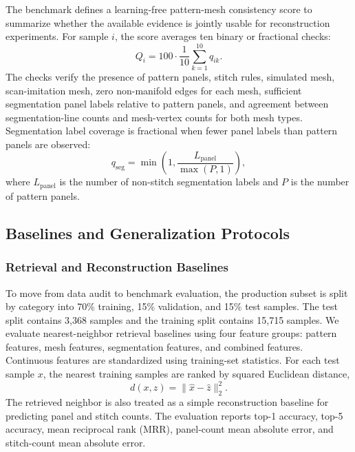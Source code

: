 \documentclass[pdflatex,sn-mathphys-num]{sn-jnl}
\begin{document}
The benchmark defines a learning-free pattern-mesh consistency score to summarize whether the available evidence is jointly usable for reconstruction experiments. For sample $i$, the score averages ten binary or fractional checks:
\begin{equation}
Q_i=100\cdot\frac{1}{10}\sum_{k=1}^{10} q_{ik}.
\end{equation}
The checks verify the presence of pattern panels, stitch rules, simulated mesh, scan-imitation mesh, zero non-manifold edges for each mesh, sufficient segmentation panel labels relative to pattern panels, and agreement between segmentation-line counts and mesh-vertex counts for both mesh types. Segmentation label coverage is fractional when fewer panel labels than pattern panels are observed:
\begin{equation}
q_{\mathrm{seg}}=\min\left(1,\frac{L_{\mathrm{panel}}}{\max(P,1)}\right),
\end{equation}
where $L_{\mathrm{panel}}$ is the number of non-stitch segmentation labels and $P$ is the number of pattern panels.

\subsection{Baselines and Generalization Protocols}

\subsubsection{Retrieval and Reconstruction Baselines}

To move from data audit to benchmark evaluation, the production subset is split by category into 70\% training, 15\% validation, and 15\% test samples. The test split contains 3,368 samples and the training split contains 15,715 samples. We evaluate nearest-neighbor retrieval baselines using four feature groups: pattern features, mesh features, segmentation features, and combined features. Continuous features are standardized using training-set statistics. For each test sample $x$, the nearest training samples are ranked by squared Euclidean distance,
\begin{equation}
d(x,z)=\|\hat{x}-\hat{z}\|_2^2.
\end{equation}
The retrieved neighbor is also treated as a simple reconstruction baseline for predicting panel and stitch counts. The evaluation reports top-1 accuracy, top-5 accuracy, mean reciprocal rank (MRR), panel-count mean absolute error, and stitch-count mean absolute error.
\end{document}
